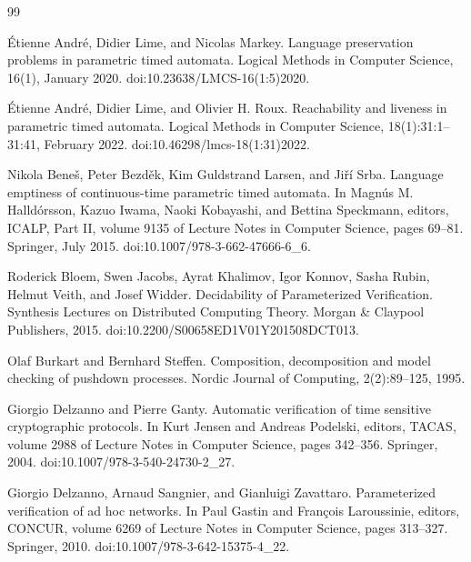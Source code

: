 \begin{thebibliography}{99}
\par\noindent    Étienne André, Didier Lime, and Nicolas Markey.  Language preservation problems in parametric timed automata.  Logical Methods in Computer Science, 16(1), January 2020.  doi:10.23638/LMCS-16(1:5)2020.  

\par\noindent    Étienne André, Didier Lime, and Olivier H. Roux.  Reachability and liveness in parametric timed automata.  Logical Methods in Computer Science, 18(1):31:1--31:41, February 2022.  doi:10.46298/lmcs-18(1:31)2022.  

\par\noindent    Nikola Beneš, Peter Bezděk, Kim Guldstrand Larsen, and Jiří Srba.  Language emptiness of continuous-time parametric timed automata.  In Magnús M. Halldórsson, Kazuo Iwama, Naoki Kobayashi, and Bettina Speckmann, editors, ICALP, Part II, volume 9135 of Lecture Notes in Computer Science, pages 69--81. Springer, July 2015.  doi:10.1007/978-3-662-47666-6\_6.  

\par\noindent    Roderick Bloem, Swen Jacobs, Ayrat Khalimov, Igor Konnov, Sasha Rubin, Helmut Veith, and Josef Widder.  Decidability of Parameterized Verification.  Synthesis Lectures on Distributed Computing Theory. Morgan \& Claypool Publishers, 2015.  doi:10.2200/S00658ED1V01Y201508DCT013.  

\par\noindent    Olaf Burkart and Bernhard Steffen.  Composition, decomposition and model checking of pushdown processes.  Nordic Journal of Computing, 2(2):89--125, 1995.  

\par\noindent    Giorgio Delzanno and Pierre Ganty.  Automatic verification of time sensitive cryptographic protocols.  In Kurt Jensen and Andreas Podelski, editors, TACAS, volume 2988 of Lecture Notes in Computer Science, pages 342--356. Springer, 2004.  doi:10.1007/978-3-540-24730-2\_27.  

\par\noindent    Giorgio Delzanno, Arnaud Sangnier, and Gianluigi Zavattaro.  Parameterized verification of ad hoc networks.  In Paul Gastin and François Laroussinie, editors, CONCUR, volume 6269 of Lecture Notes in Computer Science, pages 313--327. Springer, 2010.  doi:10.1007/978-3-642-15375-4\_22.  


\end{thebibliography}
